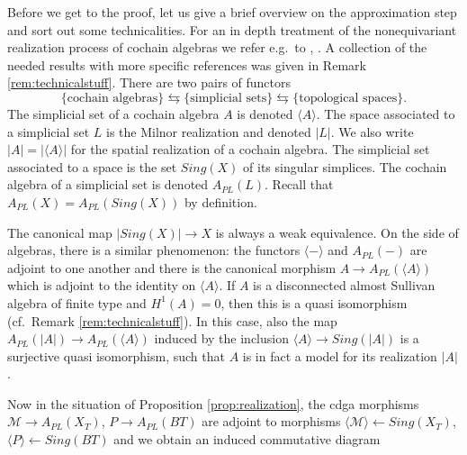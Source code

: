 \documentclass[12pt,a4paper]{article}
\theoremstyle{definition}
\begin{document}
Before we get to the proof, let us give a brief overview on the approximation step and sort out some technicalities. For an in depth treatment of the nonequivariant realization process of cochain algebras we refer e.g.\ to \cite[Chapter 17]{BibelI}, \cite[Section 1.6]{BibelII}. A collection of the needed results with more specific references was given in Remark \ref{rem:technicalstuff}. There are two pairs of functors
\[\{\text{cochain algebras}\}\leftrightarrows \{\text{simplicial sets}\}\leftrightarrows \{\text{topological spaces}\}.\]
The simplicial set of a cochain algebra $A$ is denoted $\langle A \rangle$. The space associated to a simplicial set $L$ is the Milnor realization and denoted $\vert L\vert$. We also write $\vert A\vert=\vert \langle A\rangle\vert$ for the spatial realization of a cochain algebra. The simplicial set associated to a space is the set $Sing(X)$ of its singular simplices. The cochain algebra of a simplicial set is denoted $A_{PL}(L)$. Recall that $A_{PL}(X)=A_{PL}(Sing(X))$ by definition. 

The canonical map $\vert Sing(X)\vert\rightarrow X$ is always a weak equivalence. On the side of algebras, there is a similar phenomenon: the functors $\langle -\rangle$ and $A_{PL}(-)$ are adjoint to one another and there is the canonical morphism $A\rightarrow A_{PL}(\langle A\rangle)$ which is adjoint to the identity on $\langle A\rangle$. If $A$ is a disconnected almost Sullivan algebra of finite type and $H^1(A)=0$, then this is a quasi isomorphism (cf.\ Remark \ref{rem:technicalstuff}). In this case, also the map $A_{PL}(\vert A\vert)\rightarrow A_{PL}(\langle A\rangle)$ induced by the inclusion $\langle A\rangle\rightarrow Sing(\vert A\vert)$ is a surjective quasi isomorphism, such that $A$ is in fact a model for its realization $\vert A\vert$.



Now in the situation of Proposition \ref{prop:realization}, the cdga morphisms $\mathcal{M}\rightarrow A_{PL}(X_T)$, $P\rightarrow A_{PL}(BT)$ are adjoint to morphisms $\langle \mathcal{M}\rangle\leftarrow Sing(X_T)$, $\langle P\rangle\leftarrow Sing(BT)$ and we obtain an induced commutative diagram
\end{document}
